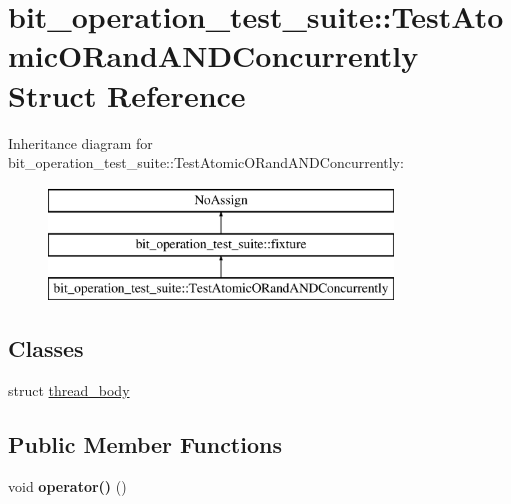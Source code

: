\hypertarget{structbit__operation__test__suite_1_1TestAtomicORandANDConcurrently}{}\section{bit\+\_\+operation\+\_\+test\+\_\+suite\+:\+:Test\+Atomic\+O\+Rand\+A\+N\+D\+Concurrently Struct Reference}
\label{structbit__operation__test__suite_1_1TestAtomicORandANDConcurrently}
Inheritance diagram for bit\+\_\+operation\+\_\+test\+\_\+suite\+:\+:Test\+Atomic\+O\+Rand\+A\+N\+D\+Concurrently\+:\begin{figure}[H]
\begin{center}
\leavevmode
\includegraphics[height=3.000000cm]{structbit__operation__test__suite_1_1TestAtomicORandANDConcurrently}
\end{center}
\end{figure}
\subsection*{Classes}
\begin{DoxyCompactItemize}
\item 
struct \hyperlink{structbit__operation__test__suite_1_1TestAtomicORandANDConcurrently_1_1thread__body}{thread\+\_\+body}
\end{DoxyCompactItemize}
\subsection*{Public Member Functions}
\begin{DoxyCompactItemize}
\item 
\hypertarget{structbit__operation__test__suite_1_1TestAtomicORandANDConcurrently_aa9adab2118683516e3a11dfaa5b057e9}{}void {\bfseries operator()} ()\label{structbit__operation__test__suite_1_1TestAtomicORandANDConcurrently_aa9adab2118683516e3a11dfaa5b057e9}

\end{DoxyCompactItemize}
